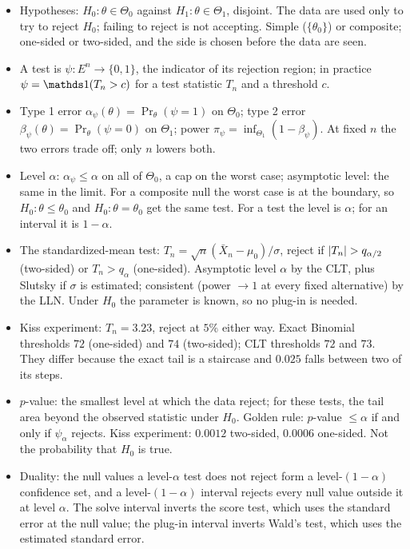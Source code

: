 \begin{itemize}[nosep]
\item Hypotheses: $H_0: \theta \in \Theta_0$ against $H_1: \theta \in \Theta_1$, disjoint. The data are used only to try to reject $H_0$; failing to reject is not accepting. Simple ($\{\theta_0\}$) or composite; one-sided or two-sided, and the side is chosen before the data are seen.
\item A test is $\psi: E^n \to \{0,1\}$, the indicator of its rejection region; in practice $\psi = \ind(T_n > c)$ for a test statistic $T_n$ and a threshold $c$.
\item Type 1 error $\alpha_\psi(\theta) = \Pr_\theta(\psi = 1)$ on $\Theta_0$; type 2 error $\beta_\psi(\theta) = \Pr_\theta(\psi = 0)$ on $\Theta_1$; power $\pi_\psi = \inf_{\Theta_1}(1 - \beta_\psi)$. At fixed $n$ the two errors trade off; only $n$ lowers both.
\item Level $\alpha$: $\alpha_\psi \leq \alpha$ on all of $\Theta_0$, a cap on the worst case; asymptotic level: the same in the limit. For a composite null the worst case is at the boundary, so $H_0: \theta \leq \theta_0$ and $H_0: \theta = \theta_0$ get the same test. For a test the level is $\alpha$; for an interval it is $1 - \alpha$.
\item The standardized-mean test: $T_n = \sqrt{n}(\bar{X}_n - \mu_0)/\sigma$, reject if $\lvert T_n\rvert > q_{\alpha/2}$ (two-sided) or $T_n > q_\alpha$ (one-sided). Asymptotic level $\alpha$ by the CLT, plus Slutsky if $\sigma$ is estimated; consistent (power $\to 1$ at every fixed alternative) by the LLN. Under $H_0$ the parameter is known, so no plug-in is needed.
\item Kiss experiment: $T_n = 3.23$, reject at $5\%$ either way. Exact Binomial thresholds $72$ (one-sided) and $74$ (two-sided); CLT thresholds $72$ and $73$. They differ because the exact tail is a staircase and $0.025$ falls between two of its steps.
\item $p$-value: the smallest level at which the data reject; for these tests, the tail area beyond the observed statistic under $H_0$. Golden rule: $p$-value $\leq \alpha$ if and only if $\psi_\alpha$ rejects. Kiss experiment: $0.0012$ two-sided, $0.0006$ one-sided. Not the probability that $H_0$ is true.
\item Duality: the null values a level-$\alpha$ test does not reject form a level-$(1-\alpha)$ confidence set, and a level-$(1-\alpha)$ interval rejects every null value outside it at level $\alpha$. The solve interval inverts the score test, which uses the standard error at the null value; the plug-in interval inverts Wald's test, which uses the estimated standard error.
\end{itemize}


